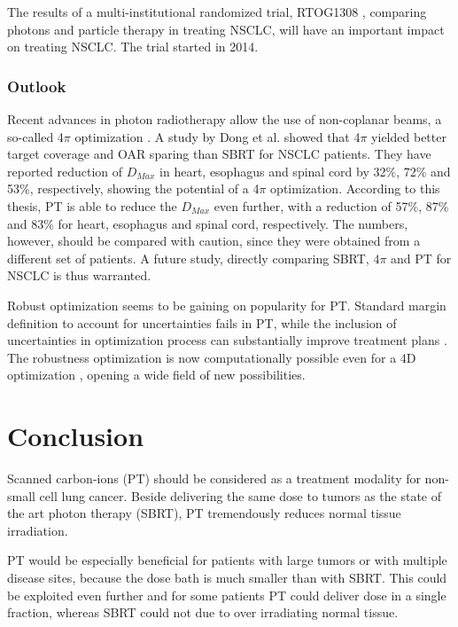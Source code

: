 The results of a multi-institutional randomized trial, RTOG1308 \cite{RTOG1308}, comparing photons and particle therapy in treating NSCLC,
will have an important impact on treating NSCLC. The trial started in 2014.


\subsection{Outlook}

Recent advances in photon radiotherapy allow the use of non-coplanar beams, a so-called 4$\pi$ optimization \cite{Dong2013}. A study by Dong et al. \cite{Dong2013b} showed that
4$\pi$ yielded better target coverage and OAR sparing than SBRT for NSCLC patients. 
They have reported reduction of $D_{Max}$ in heart, esophagus and spinal cord by 32\%, 72\% and 53\%, respectively, showing
the potential of a 4$\pi$ optimization. According to this thesis, PT is able to reduce the $D_{Max}$ even further, with a reduction of 57\%, 87\% and 83\% for heart, esophagus and spinal cord,
respectively. The numbers, however, should be compared with caution, since they were obtained from a different set of patients. 
A future study, directly comparing SBRT, $4\pi$ and PT for NSCLC is thus warranted.

Robust optimization seems to be gaining on popularity for PT. Standard margin definition to account for uncertainties fails in PT, while the inclusion of uncertainties in 
optimization process can substantially improve treatment plans \cite{Chen2012}. The robustness optimization is now computationally possible even for a 4D optimization \cite{Liu2016}, opening a wide
field of new possibilities. 
\newpage

\chapter{Conclusion}

Scanned carbon-ions (PT) should be considered as a treatment modality for non-small cell lung cancer. Beside delivering 
the same dose to tumors as the state of the art photon therapy (SBRT), PT tremendously reduces normal tissue irradiation.

PT would be especially beneficial for patients with large tumors or with multiple disease sites, because the dose bath is much
smaller than with SBRT. This could be exploited even further and for some patients PT could deliver dose in a single fraction, whereas SBRT could not due to over irradiating
normal tissue.

